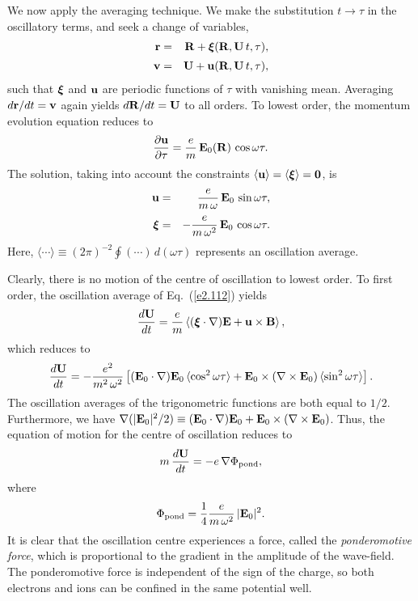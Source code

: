 We now apply the averaging technique. We make the substitution $t\rightarrow\tau$
in the oscillatory terms, and seek a change of variables,
\begin{eqnarray}
{\bf r} &=& {\bf R} + \mbox{\boldmath$\xi$}({\bf R}, {\bf U}\, t,\tau),\\[0.5ex]
{\bf v} &=& {\bf U} + {\bf u}({\bf R}, {\bf U}\, t,\tau),
\end{eqnarray}
such that $\mbox{\boldmath$\xi$}$ and ${\bf u}$ are periodic functions of $\tau$
with vanishing mean. Averaging $d{\bf r}/dt = {\bf v}$ again yields
$d{\bf R}/dt = {\bf U}$ to all orders. To lowest order, the momentum evolution
equation reduces to
\begin{equation}
\frac{\partial{\bf u}}{\partial \tau} = \frac{e}{m}\,{\bf E}_0({\bf R})\,\cos\omega\tau.
\end{equation}
The solution, taking into account the constraints $\langle {\bf u}\rangle
=\langle\mbox{\boldmath$\xi$}\rangle = {\bf 0}$, is
\begin{eqnarray}
{\bf u} &=& \frac{e}{m\,\omega}\,{\bf E}_0\,\sin\omega\tau,\\[0.5ex]
\mbox{\boldmath$\xi$} &=& -\frac{e}{m\,\omega^2}\,{\bf E}_0\,\cos\omega\tau.
\end{eqnarray}
Here, $\langle\cdots\rangle\equiv(2\pi)^{-2}\oint(\cdots)\,d(\omega\tau)$ represents
an oscillation average. 

Clearly, there is no motion of the centre of oscillation to lowest order.
To first order, the oscillation average of Eq.~(\ref{e2.112}) yields
\begin{equation}
\frac{d{\bf U}}{dt} = \frac{e}{m} \left\langle (\mbox{\boldmath$\xi$}\cdot\nabla)
{\bf E} + {\bf u}\times{\bf B}\right\rangle,
\end{equation}
which reduces to
\begin{equation}\label{e2.120}
\frac{d{\bf U}}{dt} = -\frac{e^2}{m^2\,\omega^2}
\left[ ({\bf E}_0\cdot\nabla){\bf E}_0\,\langle\cos^2\omega\tau\rangle
+ {\bf E}_0\times(\nabla\times{\bf E}_0)\,\langle\sin^2\omega\tau\rangle
\right].
\end{equation}
The oscillation averages of the trigonometric functions are both equal to $1/2$. 
Furthermore, we have
$\nabla(|{\bf E}_0|^2/2)\equiv  ({\bf E}_0\cdot\nabla){\bf E}_0
+{\bf E}_0\times(\nabla\times{\bf E}_0)$. Thus, the equation of motion for
the centre of oscillation reduces to
\begin{equation}
m\,\frac {d{\bf U}}{dt} = -e\,\nabla{\Phi}_{\rm pond},
\end{equation}
where
\begin{equation}
{\Phi}_{\rm pond} = \frac{1}{4} \frac{e}{m\,\omega^2}\,|{\bf E}_0|^2.
\end{equation}
It is clear that the oscillation centre experiences a force, called the
{\em ponderomotive force}, which is proportional to the gradient
in the amplitude of the wave-field. The ponderomotive force is
independent of the sign of the charge, so both electrons and
ions can be confined in the same potential well. 

